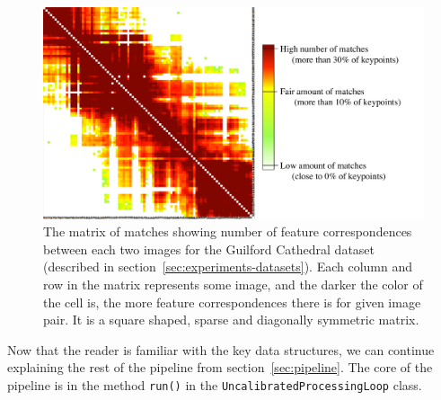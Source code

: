 \begin{figure}[htb]
	\begin{center}
		\includegraphics[keepaspectratio,width=12cm]{fig/matches-matrix.pdf}
	\end{center}
	\caption{The matrix of matches showing number of feature correspondences between each two images for the Guilford Cathedral dataset (described in section~\ref{sec:experiments-datasets}). Each column and row in the matrix represents some image, and the darker the color of the cell is, the more feature correspondences there is for given image pair. It is a square shaped, sparse and diagonally symmetric matrix. }
	\label{fig:matches-matrix}
\end{figure}


Now that the reader is familiar with the key data structures, we can continue explaining the rest of the pipeline from section~\ref{sec:pipeline}. The core of the pipeline is in the method \texttt{run()} in the \texttt{UncalibratedProcessingLoop} class.

